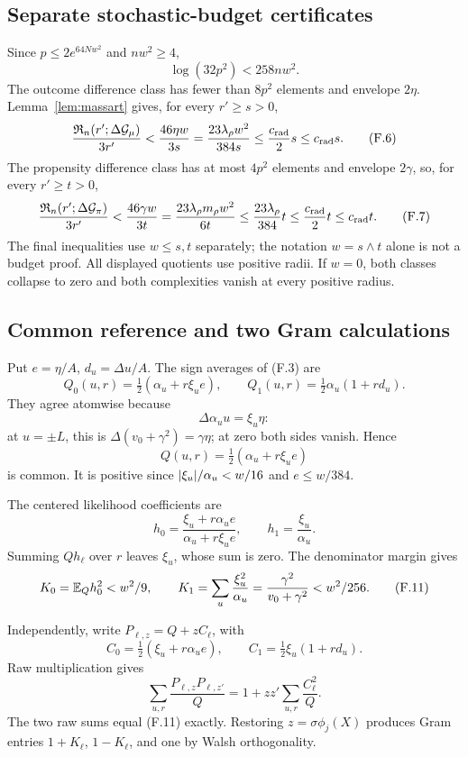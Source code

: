 \subsection{Separate stochastic-budget certificates}

Since \(p\le2e^{64Nw^2}\) and \(nw^2\ge4\),
\[
 \log(32p^2)<258nw^2.
 \tag{F.5}
\]
The outcome difference class has fewer than \(8p^2\) elements and envelope
\(2\eta\).  Lemma~\ref{lem:massart} gives, for every \(r'\ge s>0\),
\[
 \frac{\mathfrak R_n(r';\Delta\mathcal G_\mu)}{3r'}
 <\frac{46\eta w}{3s}
 =\frac{23\lambda_\rho w^2}{384s}
 \le\frac{c_{\rm rad}}2s\le c_{\rm rad}s.
 \tag{F.6}
\]
The propensity difference class has at most \(4p^2\) elements and envelope
\(2\gamma\), so, for every \(r'\ge t>0\),
\[
 \frac{\mathfrak R_n(r';\Delta\mathcal G_\pi)}{3r'}
 <\frac{46\gamma w}{3t}
 =\frac{23\lambda_\rho m_\rho w^2}{6t}
 \le\frac{23\lambda_\rho}{384}t
 \le\frac{c_{\rm rad}}2t\le c_{\rm rad}t.
 \tag{F.7}
\]
The final inequalities use \(w\le s,t\) separately; the notation
\(w=s\wedge t\) alone is not a budget proof.  All displayed quotients use
positive radii.  If \(w=0\), both classes collapse to zero and both
complexities vanish at every positive radius.

\subsection{Common reference and two Gram calculations}

Put \(e=\eta/A\), \(d_u=\Delta u/A\).  The sign averages of (F.3) are
\[
 Q_0(u,r)=\tfrac12(\alpha_u+r\xi_ue),\qquad
 Q_1(u,r)=\tfrac12\alpha_u(1+rd_u).
\]
They agree atomwise because
\[
 \Delta\alpha_uu=\xi_u\eta:
 \tag{F.8}
\]
at \(u=\pm L\), this is
\(\Delta(v_0+\gamma^2)=\gamma\eta\); at zero both sides vanish.  Hence
\[
 Q(u,r)=\tfrac12(\alpha_u+r\xi_ue)
 \tag{F.9}
\]
is common.  It is positive since
\(\lvert \xi_u\rvert/\alpha_u<w/16\) and \(e\le w/384\).

The centered likelihood coefficients are
\[
 h_0=\frac{\xi_u+r\alpha_ue}{\alpha_u+r\xi_ue},\qquad
 h_1=\frac{\xi_u}{\alpha_u}.
 \tag{F.10}
\]
Summing \(Qh_\ell\) over \(r\) leaves \(\xi_u\), whose sum is zero.
The denominator margin gives
\[
 K_0=\mathbb E_Qh_0^2<w^2/9,\qquad
 K_1=\sum_u\frac{\xi_u^2}{\alpha_u}
 =\frac{\gamma^2}{v_0+\gamma^2}<w^2/256.
 \tag{F.11}
\]

Independently, write \(P_{\ell,z}=Q+zC_\ell\), with
\[
 C_0=\tfrac12(\xi_u+r\alpha_ue),\qquad
 C_1=\tfrac12\xi_u(1+rd_u).
\]
Raw multiplication gives
\[
 \sum_{u,r}\frac{P_{\ell,z}P_{\ell,z'}}Q
 =1+zz'\sum_{u,r}\frac{C_\ell^2}Q.
 \tag{F.12}
\]
The two raw sums equal (F.11) exactly.  Restoring
\(z=\sigma\phi_j(X)\) produces Gram entries \(1+K_\ell\),
\(1-K_\ell\), and one by Walsh orthogonality.

